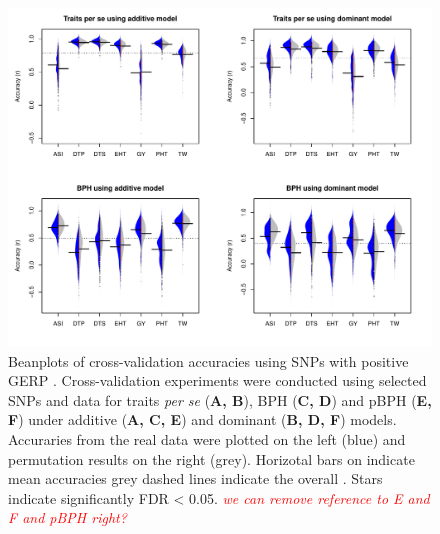 \documentclass[9pt,twocolumn,twoside]{gsajnl}
\newcommand{\jri}[1]{\textcolor{red}{ \emph{ #1}} }
\begin{document}
\DIFaddend \begin{figure}[htbp]
\centering
\includegraphics[width=\linewidth]{Figure_gerpall.pdf}
\caption{Beanplots of cross-validation accuracies using SNPs with positive GERP \DIFdelbeginFL {}\DIFdelendFL \DIFaddbeginFL {}\DIFaddendFL . Cross-validation experiments were conducted using selected SNPs and \DIFdelbeginFL {}\DIFdelendFL \DIFaddbeginFL {}\DIFaddendFL data \DIFdelbeginFL {}\DIFdelendFL for traits \emph{per se} (\textbf{A, B}), BPH (\textbf{C, D}) and pBPH (\textbf{E, F}) under additive (\textbf{A, C, E}) and dominant (\textbf{B, D, F}) models. Accuraries from the real data were plotted on the left \DIFdelbeginFL {}\DIFdelendFL (blue) and permutation results \DIFdelbeginFL {}\DIFdelendFL on the right (grey). Horizotal bars on \DIFdelbeginFL {}\DIFdelendFL indicate mean accuracies \DIFdelbeginFL {}\DIFdelendFL \DIFaddbeginFL {}\DIFaddendFL grey dashed lines indicate the overall \DIFdelbeginFL {}\DIFdelendFL \DIFaddbeginFL {}\DIFaddendFL . Stars indicate significantly \DIFdelbeginFL {}\DIFdelendFL \DIFaddbeginFL \DIFaddFL{(}\DIFaddendFL FDR < 0.05\DIFaddbeginFL {}\DIFaddendFL . \DIFaddbeginFL \jri{we can remove reference to E and F and pBPH right?}\DIFaddendFL }
\label{fig:gerpall}
\end{figure}
\end{document}
